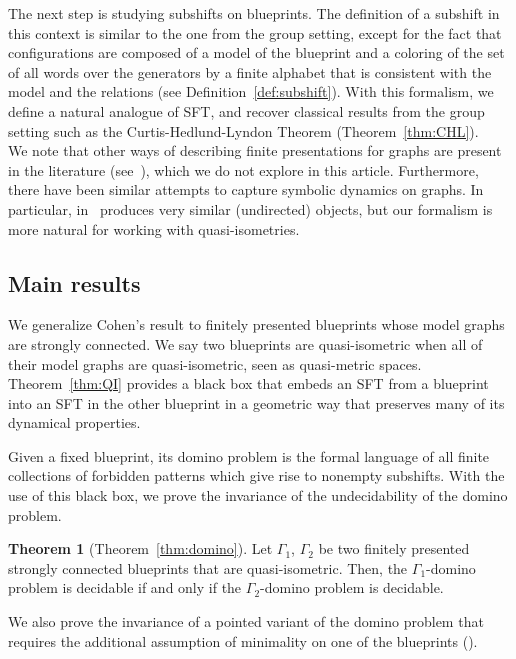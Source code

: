 \documentclass{article}
\theoremstyle{definition}
\theoremstyle{definition}
\newtheorem{thmx}{Theorem}
\begin{document}
The next step is studying subshifts on blueprints. The definition of a subshift in this context is similar to the one from the group setting, except for the fact that configurations are composed of a model of the blueprint and a coloring of the set of all words over the generators by a finite alphabet that is consistent with the model and the relations (see Definition~\ref{def:subshift}). With this formalism, we define a natural analogue of SFT, and recover classical results from the group setting such as the Curtis-Hedlund-Lyndon Theorem (Theorem~\ref{thm:CHL}).\\

We note that other ways of describing finite presentations for graphs are present in the literature (see~\cite{arrighi2023graph,meyer2005graphes}), which we do not explore in this article.  Furthermore, there have been similar attempts to capture symbolic dynamics on graphs. In particular, in~\cite{arrighi2023graph} produces very similar (undirected) objects, but our formalism is more natural for working with quasi-isometries.

\subsection*{Main results }
We generalize Cohen's result to finitely presented blueprints whose model graphs are strongly connected. We say two blueprints are quasi-isometric when all of their model graphs are quasi-isometric, seen as quasi-metric spaces. Theorem~\ref{thm:QI} provides a black box that embeds an SFT from a blueprint into an SFT in the other blueprint in a geometric way that preserves many of its dynamical properties. 


Given a fixed blueprint, its domino problem is the formal language of all finite collections of forbidden patterns which give rise to nonempty subshifts. With the use of this black box, we prove the invariance of the undecidability of the domino problem.

\begin{thmx}[Theorem~\ref{thm:domino}]
    Let $\Gamma_1$, $\Gamma_2$ be two finitely presented strongly connected blueprints that are quasi-isometric. Then, the $\Gamma_1$-domino problem is decidable if and only if the $\Gamma_2$-domino problem is decidable.
\end{thmx}

We also prove the invariance of a pointed variant of the domino problem that requires the additional assumption of minimality on one of the blueprints ().
\end{document}
